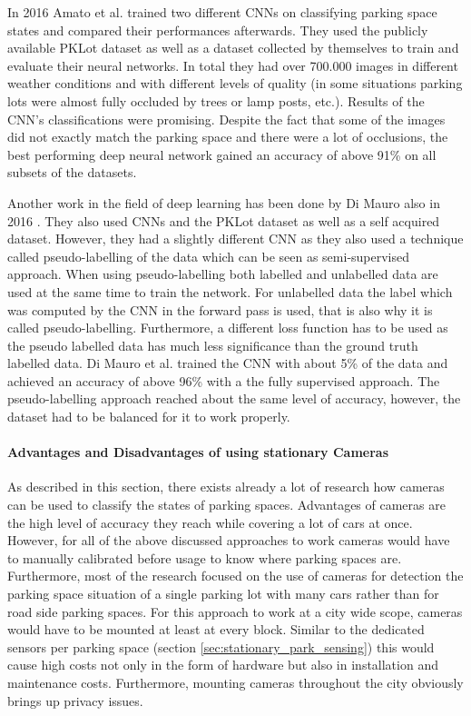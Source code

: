 In 2016 Amato et al. \cite{Amato2016} trained two different CNNs on classifying parking space states and compared their performances afterwards. They used the publicly available PKLot dataset as well as a dataset collected by themselves to train and evaluate their neural networks. In total they had over 700.000 images in different weather conditions and with different levels of quality (in some situations parking lots were almost fully occluded by trees or lamp posts, etc.). Results of the CNN's classifications were promising. Despite the fact that some of the images did not exactly match the parking space and there were a lot of occlusions, the best performing deep neural network gained an accuracy of above 91\% on all subsets of the datasets. 

Another work in the field of deep learning has been done by Di Mauro also in 2016 \cite{DiMauro2016}. They also used CNNs and the PKLot dataset as well as a self acquired dataset. However, they had a slightly different CNN as they also used a technique called pseudo-labelling of the data which can be seen as semi-supervised approach. When using pseudo-labelling both labelled and unlabelled data are used at the same time to train the network. For unlabelled data the label which was computed by the CNN in the forward pass is used, that is also why it is called pseudo-labelling. Furthermore, a different loss function has to be used as the pseudo labelled data has much less significance than the ground truth labelled data. Di Mauro et al. trained the CNN with about 5\% of the data and achieved an accuracy of above 96\% with a the fully supervised approach. The pseudo-labelling approach reached about the same level of accuracy, however, the dataset had to be balanced for it to work properly.


\paragraph{Advantages and Disadvantages of using stationary Cameras}

As described in this section, there exists already a lot of research how cameras can be used to classify the states of parking spaces. Advantages of cameras are the high level of accuracy they reach while covering a lot of cars at once. However, for all of the above discussed approaches to work cameras would have to manually calibrated before usage to know where parking spaces are. Furthermore, most of the research focused on the use of cameras for detection the parking space situation of a single parking lot with many cars rather than for road side parking spaces. For this approach to work at a city wide scope, cameras would have to be mounted at least at every block. Similar to the dedicated sensors per parking space (section \ref{sec:stationary_park_sensing}) this would cause high costs not only in the form of hardware but also in installation and maintenance costs. Furthermore, mounting cameras throughout the city obviously brings up privacy issues.





